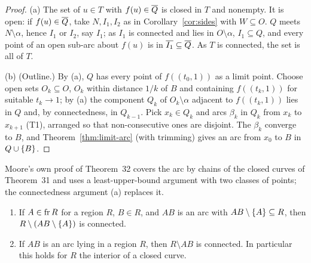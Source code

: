 \begin{proof}
(a) The set of $u\in T$ with $f(u)\in\overline{Q}$ is closed in $T$ and nonempty. It is open: if $f(u)\in\overline{Q}$, take $N,I_1,I_2$
as in Corollary~\ref{cor:sides} with $W\subseteq O$. $Q$ meets $N\setminus\alpha$, hence $I_1$ or $I_2$, say $I_1$; as $I_1$ is
connected and lies in $O\setminus\alpha$, $I_1\subseteq Q$, and every point of an open sub-arc about $f(u)$ is in $\overline{I_1}\subseteq\overline{Q}$. As $T$ is connected, the set is all of $T$.

(b) (Outline.) By (a), $Q$ has every point of $f((t_0,1))$ as a limit point. Choose open sets $O_k\subseteq O$, $O_k$ within
distance $1/k$ of $B$ and containing $f((t_k,1))$ for suitable $t_k\to1$; by (a) the component $Q_k$ of $O_k\setminus\alpha$ adjacent to
$f((t_k,1))$ lies in $Q$ and, by connectedness, in $Q_{k-1}$. Pick $x_k\in Q_k$ and arcs $\beta_k$ in $Q_k$ from $x_k$ to
$x_{k+1}$ (T1), arranged so that non-consecutive ones are disjoint. The $\beta_k$ converge to $B$, and
Theorem~\ref{thm:limit-arc} (with trimming) gives an arc from $x_0$ to $B$ in $Q\cup\left\{ B \right\}$.
\end{proof}


Moore's own proof of Theorem~32 covers the arc by chains of the closed curves of Theorem~31 and uses a least-upper-bound
argument with two classes of points; the connectedness argument (a) replaces it.

\begin{theorem}\label{thm:fa33-34}
\leavevmode
\begin{enumerate}[label=(\alph*)]
\item If $A\in\operatorname{fr} R$ for a region $R$, $B\in R$, and $AB$ is an arc with $AB\setminus\left\{ A \right\}\subseteq R$, then
$R\setminus(AB\setminus\left\{ A \right\})$ is connected.
\item If $AB$ is an arc lying in a region $R$, then $R\setminus AB$ is connected. In particular this holds for $R$ the
interior of a closed curve.
\end{enumerate}
\end{theorem}

